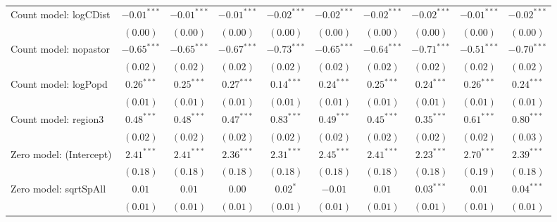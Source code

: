\begin{table}
\begin{center}
{\begin{tabular}{l c c c c c c c c c}
Count model: logCDist          & $-0.01^{***}$  & $-0.01^{***}$  & $-0.01^{***}$ & $-0.02^{***}$ & $-0.02^{***}$ & $-0.02^{***}$   & $-0.02^{***}$ & $-0.01^{***}$ & $-0.02^{***}$   \\
                               & $(0.00)$       & $(0.00)$       & $(0.00)$      & $(0.00)$      & $(0.00)$      & $(0.00)$        & $(0.00)$      & $(0.00)$      & $(0.00)$        \\
Count model: nopastor          & $-0.65^{***}$  & $-0.65^{***}$  & $-0.67^{***}$ & $-0.73^{***}$ & $-0.65^{***}$ & $-0.64^{***}$   & $-0.71^{***}$ & $-0.51^{***}$ & $-0.70^{***}$   \\
                               & $(0.02)$       & $(0.02)$       & $(0.02)$      & $(0.02)$      & $(0.02)$      & $(0.02)$        & $(0.02)$      & $(0.02)$      & $(0.02)$        \\
Count model: logPopd           & $0.26^{***}$   & $0.25^{***}$   & $0.27^{***}$  & $0.14^{***}$  & $0.24^{***}$  & $0.25^{***}$    & $0.24^{***}$  & $0.26^{***}$  & $0.24^{***}$    \\
                               & $(0.01)$       & $(0.01)$       & $(0.01)$      & $(0.01)$      & $(0.01)$      & $(0.01)$        & $(0.01)$      & $(0.01)$      & $(0.01)$        \\
Count model: region3           & $0.48^{***}$   & $0.48^{***}$   & $0.47^{***}$  & $0.83^{***}$  & $0.49^{***}$  & $0.45^{***}$    & $0.35^{***}$  & $0.61^{***}$  & $0.80^{***}$    \\
                               & $(0.02)$       & $(0.02)$       & $(0.02)$      & $(0.02)$      & $(0.02)$      & $(0.02)$        & $(0.02)$      & $(0.02)$      & $(0.03)$        \\
Zero model: (Intercept)        & $2.41^{***}$   & $2.41^{***}$   & $2.36^{***}$  & $2.31^{***}$  & $2.45^{***}$  & $2.41^{***}$    & $2.23^{***}$  & $2.70^{***}$  & $2.39^{***}$    \\
                               & $(0.18)$       & $(0.18)$       & $(0.18)$      & $(0.18)$      & $(0.18)$      & $(0.18)$        & $(0.18)$      & $(0.19)$      & $(0.18)$        \\
Zero model: sqrtSpAll          & $0.01$         & $0.01$         & $0.00$        & $0.02^{*}$    & $-0.01$       & $0.01$          & $0.03^{***}$  & $0.01$        & $0.04^{***}$    \\
                               & $(0.01)$       & $(0.01)$       & $(0.01)$      & $(0.01)$      & $(0.01)$      & $(0.01)$        & $(0.01)$      & $(0.01)$      & $(0.01)$        \\

\end{tabular}}
\end{center}
\end{table}
